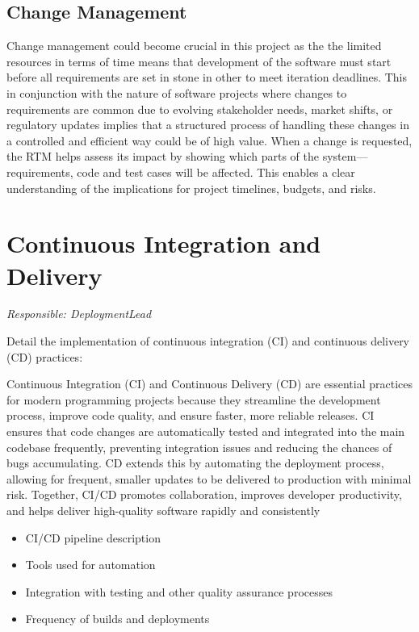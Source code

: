 \documentclass{article}
\begin{document}
\subsection{Change Management}
Change management could become crucial in this project as the the limited resources in terms of time means that development of the software must start before all requirements are set in stone in other to meet iteration deadlines. This in conjunction with the nature of software projects where changes to requirements are common due to evolving stakeholder needs, market shifts, or regulatory updates implies that a structured process of handling these changes in a controlled and efficient way could be of high value. When a change is requested, the RTM helps assess its impact by showing which parts of the system—requirements, code and test cases will be affected. This enables a clear understanding of the implications for project timelines, budgets, and risks.

\newpage
\section{Continuous Integration and Delivery}
\textit{Responsible: DeploymentLead}

Detail the implementation of continuous integration (CI) and continuous delivery (CD) practices:

Continuous Integration (CI) and Continuous Delivery (CD) are essential practices for modern programming projects because they streamline the development process, improve code quality, and ensure faster, more reliable releases. CI ensures that code changes are automatically tested and integrated into the main codebase frequently, preventing integration issues and reducing the chances of bugs accumulating. CD extends this by automating the deployment process, allowing for frequent, smaller updates to be delivered to production with minimal risk. Together, CI/CD promotes collaboration, improves developer productivity, and helps deliver high-quality software rapidly and consistently

\begin{itemize}
    \item CI/CD pipeline description
    \item Tools used for automation
    \item Integration with testing and other quality assurance processes
    \item Frequency of builds and deployments
\end{itemize}
\end{document}
